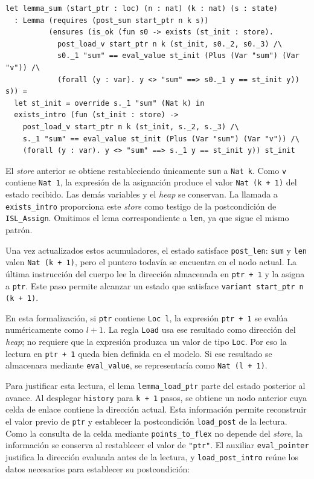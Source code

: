 \documentclass[a4paper,	11pt]{report}
\begin{document}
\begin{lstlisting}
let lemma_sum (start_ptr : loc) (n : nat) (k : nat) (s : state)
  : Lemma (requires (post_sum start_ptr n k s))
          (ensures (is_ok (fun s0 -> exists (st_init : store).
            post_load_v start_ptr n k (st_init, s0._2, s0._3) /\
            s0._1 "sum" == eval_value st_init (Plus (Var "sum") (Var "v")) /\
            (forall (y : var). y <> "sum" ==> s0._1 y == st_init y)) s)) =
  let st_init = override s._1 "sum" (Nat k) in
  exists_intro (fun (st_init : store) ->
    post_load_v start_ptr n k (st_init, s._2, s._3) /\
    s._1 "sum" == eval_value st_init (Plus (Var "sum") (Var "v")) /\
    (forall (y : var). y <> "sum" ==> s._1 y == st_init y)) st_init
\end{lstlisting}
El \emph{store} anterior se obtiene restableciendo únicamente \lstinline|sum| a \lstinline|Nat k|.
Como \lstinline|v| contiene \lstinline|Nat 1|,
la expresión de la asignación produce el valor \lstinline|Nat (k + 1)| del estado recibido.
Las demás variables y el \emph{heap} se conservan.
La llamada a \lstinline|exists_intro| proporciona este \emph{store} como testigo de la postcondición de \lstinline|ISL_Assign|.
Omitimos el lema correspondiente a \lstinline|len|,
ya que sigue el mismo patrón.

Una vez actualizados estos acumuladores,
el estado satisface \lstinline|post_len|:
\lstinline|sum| y \lstinline|len| valen \lstinline|Nat (k + 1)|,
pero el puntero todavía se encuentra en el nodo actual.
La última instrucción del cuerpo lee la dirección almacenada en \lstinline|ptr + 1| y la asigna a \lstinline|ptr|.
Este paso permite alcanzar un estado que satisface \lstinline|variant start_ptr n (k + 1)|.

En esta formalización,
si \lstinline|ptr| contiene \lstinline|Loc l|,
la expresión \lstinline|ptr + 1| se evalúa numéricamente como $l + 1$.
La regla \lstinline|Load| usa ese resultado como dirección del \emph{heap};
no requiere que la expresión produzca un valor de tipo \lstinline|Loc|.
Por eso la lectura en \lstinline|ptr + 1| queda bien definida en el modelo.
Si ese resultado se almacenara mediante \lstinline|eval_value|,
se representaría como \lstinline|Nat (l + 1)|.

Para justificar esta lectura,
el lema \lstinline|lemma_load_ptr| parte del estado posterior al avance.
Al desplegar \lstinline|history| para \lstinline|k + 1| pasos,
se obtiene un nodo anterior cuya celda de enlace contiene la dirección actual.
Esta información permite reconstruir el valor previo de \lstinline|ptr| y establecer la postcondición \lstinline|load_post| de la lectura.
Como la consulta de la celda mediante \lstinline|points_to_flex| no depende del \emph{store},
la información se conserva al restablecer el valor de \lstinline|"ptr"|.
El auxiliar \lstinline|eval_pointer| justifica la dirección evaluada antes de la lectura,
y \lstinline|load_post_intro| reúne los datos necesarios para establecer su postcondición:
\end{document}

